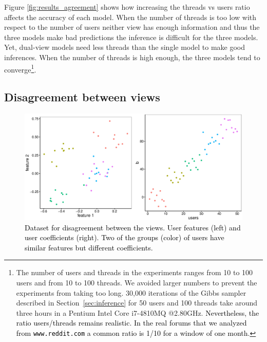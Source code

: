 \documentclass[smallextended]{svjour3}          %
\newcommand\alberto[1]{\textcolor{black}{#1}}
\begin{document}
Figure \ref{fig:results_agreement} shows how increasing the threads vs users ratio affects the accuracy of each model. When the number of threads is too low with respect to the number of users neither view has enough information and thus the three models make bad predictions the inference is difficult for the three models. Yet, dual-view models need less threads than the single model to make good inferences. When the number of threads is high enough, the three models tend to converge\footnote{The number of users and threads in the experiments ranges from 10 to 100 users and from 10 to 100 threads. We avoided larger numbers to prevent the experiments from taking too long. 30,000 iterations of the Gibbs sampler described in Section~\ref{sec:inference} for 50 users and 100 threads take around three hours in a Pentium Intel Core i7-4810MQ @2.80GHz. \alberto{Nevertheless, the ratio users/threads remains realistic. In the real forums that we analyzed from \texttt{www.reddit.com} a common ratio is 1/10 for a window of one month.}}.
\subsection{Disagreement between views}

\begin{figure}
	\centering
	\includegraphics[width=1\textwidth]{Fig4_data_disagreement}
	\caption{\alberto{Dataset for disagreement between the views. User features (left) and user coefficients (right). Two of the groups (color) of users have similar features but different coefficients.}}
	\label{fig:data_disagreement}
\end{figure}
\end{document}
